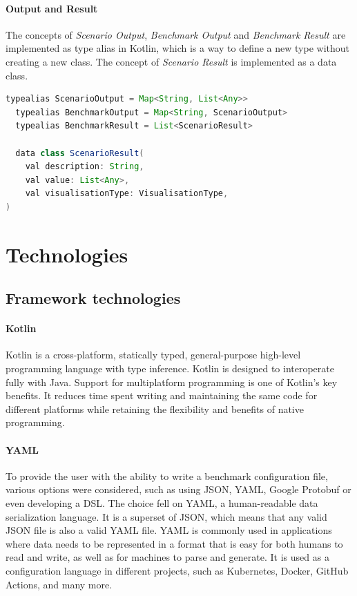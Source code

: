 \documentclass[12pt,a4paper,openright,twoside]{book}
\begin{document}
\paragraph*{Output and Result}

The concepts of \emph{Scenario Output}, \emph{Benchmark Output} and \emph{Benchmark Result} are implemented as type alias in Kotlin, which is a way to define a new type without creating a new class.
The concept of \emph{Scenario Result} is implemented as a data class.

\begin{lstlisting}[language=Java]
  typealias ScenarioOutput = Map<String, List<Any>>
  typealias BenchmarkOutput = Map<String, ScenarioOutput>
  typealias BenchmarkResult = List<ScenarioResult>

  data class ScenarioResult(
    val description: String,
    val value: List<Any>,
    val visualisationType: VisualisationType,
)
\end{lstlisting}

\section{Technologies}

\subsection*{Framework technologies}

\paragraph*{Kotlin}

Kotlin is a cross-platform, statically typed, general-purpose high-level programming language with type inference.
Kotlin is designed to interoperate fully with Java.
Support for multiplatform programming is one of Kotlin’s key benefits. It reduces time spent writing and maintaining
the same code for different platforms while retaining the flexibility and benefits of native programming.

\paragraph*{YAML}
To provide the user with the ability to write a benchmark configuration file, various options were considered, such as using JSON, YAML, Google Protobuf or even developing a DSL. 
The choice fell on YAML, a human-readable data serialization language. It is a superset of JSON, which means that any valid JSON file is also a valid YAML file.
YAML is commonly used in applications where data needs to be represented in a format that is easy for both humans to read and write, as well as for machines to parse and generate.
It is used as a configuration language in different projects, such as Kubernetes, Docker, GitHub Actions, and many more.
\end{document}
